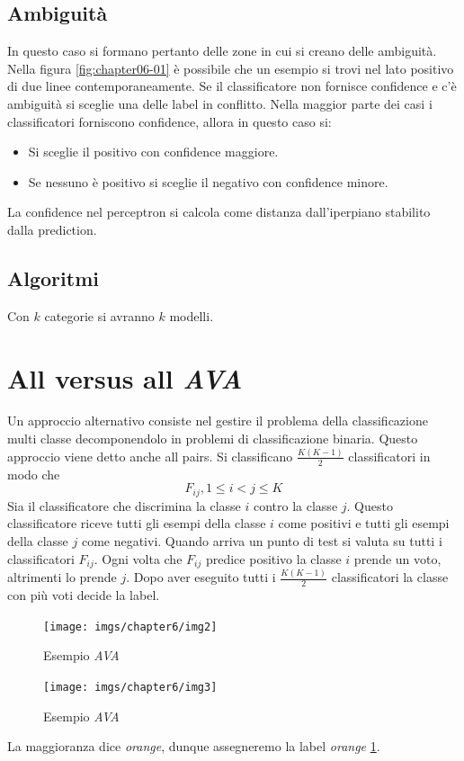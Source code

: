 	\subsection{Ambiguit\`a}
	In questo caso si formano pertanto delle zone in cui si creano delle ambiguit\`a. 
	Nella figura \ref{fig:chapter06-01} \`e possibile che un esempio si trovi nel lato positivo di due linee contemporaneamente.
	Se il classificatore non fornisce confidence e c'\`e ambiguit\`a si sceglie una delle label in conflitto.
	Nella maggior parte dei casi i classificatori forniscono confidence, allora in questo caso si:
	\begin{itemize}
		\item Si sceglie il positivo con confidence maggiore.
		\item Se nessuno \`e positivo si sceglie il negativo con confidence minore.
	\end{itemize}
	La confidence nel perceptron si calcola come distanza dall'iperpiano stabilito dalla prediction.
	
	\subsection{Algoritmi}
	
	
	Con $k$ categorie si avranno $k$ modelli.
	
	

\section{All versus all \emph{AVA}}
Un approccio alternativo consiste nel gestire il problema della classificazione multi classe decomponendolo in problemi di classificazione binaria.
Questo approccio viene detto anche all pairs.
Si classificano $\frac{K(K-1)}{2}$ classificatori in modo che
$$F_{ij}, 1\le i< j \le K$$
Sia il classificatore che discrimina la classe $i$ contro la classe $j$.
Questo classificatore riceve tutti gli esempi della classe $i$ come positivi e tutti gli esempi della classe $j$ come negativi.
Quando arriva un punto di test si valuta su tutti i classificatori $F_{ij}$.
Ogni volta che $F_{ij}$ predice positivo la classe $i$ prende un voto, altrimenti lo prende $j$.
Dopo aver eseguito tutti i $\frac{K(K-1)}{2}$ classificatori la classe con pi\`u voti decide la label.

\begin{figure}
	\centering
	\begin{minipage}{.5\textwidth}
		\centering
		\texttt{[image: imgs/chapter6/img2]}
		\caption{Esempio \emph{AVA}}
		\label{fig:chapter06-02}
	\end{minipage}%
	\begin{minipage}{.5\textwidth}
		\centering
		\texttt{[image: imgs/chapter6/img3]}
		\caption{Esempio \emph{AVA}}
		\label{fig:chapter06-03}
	\end{minipage}
\end{figure}
La maggioranza dice \emph{orange}, dunque assegneremo la label \emph{orange} \ref{fig:chapter06-03}.
